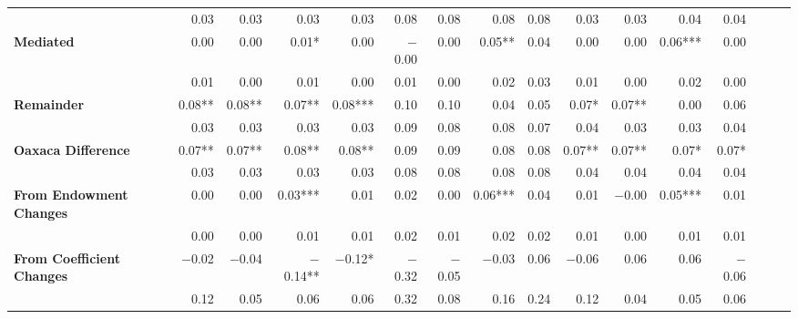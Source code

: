 \begin{tabular}{@{\extracolsep{5pt}}lrrrrrrrrrrrrrrr}
{\bf  } & 0.03\phantom{***} & 0.03\phantom{***} & 0.03\phantom{***} & 0.03\phantom{***} & 0.08\phantom{***} & 0.08\phantom{***} & 0.08\phantom{***} & 0.08\phantom{***} & 0.03\phantom{***} & 0.03\phantom{***} & 0.04\phantom{***} & 0.04\phantom{***} \\
{\bf Mediated} & 0.00\phantom{***} & 0.00\phantom{***} & 0.01*\phantom{**} & 0.00\phantom{***} & $-$0.00\phantom{***} & 0.00\phantom{***} & 0.05**\phantom{*} & 0.04\phantom{***} & 0.00\phantom{***} & 0.00\phantom{***} & 0.06*** & 0.00\phantom{***} \\
{\bf  } & 0.01\phantom{***} & 0.00\phantom{***} & 0.01\phantom{***} & 0.00\phantom{***} & 0.01\phantom{***} & 0.00\phantom{***} & 0.02\phantom{***} & 0.03\phantom{***} & 0.01\phantom{***} & 0.00\phantom{***} & 0.02\phantom{***} & 0.00\phantom{***} \\
{\bf Remainder} & 0.08**\phantom{*} & 0.08**\phantom{*} & 0.07**\phantom{*} & 0.08*** & 0.10\phantom{***} & 0.10\phantom{***} & 0.04\phantom{***} & 0.05\phantom{***} & 0.07*\phantom{**} & 0.07**\phantom{*} & 0.00\phantom{***} & 0.06\phantom{***} \\
{\bf  } & 0.03\phantom{***} & 0.03\phantom{***} & 0.03\phantom{***} & 0.03\phantom{***} & 0.09\phantom{***} & 0.08\phantom{***} & 0.08\phantom{***} & 0.07\phantom{***} & 0.04\phantom{***} & 0.03\phantom{***} & 0.03\phantom{***} & 0.04\phantom{***} \\
{\bf Oaxaca Difference} & 0.07**\phantom{*} & 0.07**\phantom{*} & 0.08**\phantom{*} & 0.08**\phantom{*} & 0.09\phantom{***} & 0.09\phantom{***} & 0.08\phantom{***} & 0.08\phantom{***} & 0.07**\phantom{*} & 0.07**\phantom{*} & 0.07*\phantom{**} & 0.07*\phantom{**} \\
{\bf  } & 0.03\phantom{***} & 0.03\phantom{***} & 0.03\phantom{***} & 0.03\phantom{***} & 0.08\phantom{***} & 0.08\phantom{***} & 0.08\phantom{***} & 0.08\phantom{***} & 0.04\phantom{***} & 0.04\phantom{***} & 0.04\phantom{***} & 0.04\phantom{***} \\
{\bf From Endowment Changes} & 0.00\phantom{***} & 0.00\phantom{***} & 0.03*** & 0.01\phantom{***} & 0.02\phantom{***} & 0.00\phantom{***} & 0.06*** & 0.04\phantom{***} & 0.01\phantom{***} & $-$0.00\phantom{***} & 0.05*** & 0.01\phantom{***} \\
{\bf  } & 0.00\phantom{***} & 0.00\phantom{***} & 0.01\phantom{***} & 0.01\phantom{***} & 0.02\phantom{***} & 0.01\phantom{***} & 0.02\phantom{***} & 0.02\phantom{***} & 0.01\phantom{***} & 0.00\phantom{***} & 0.01\phantom{***} & 0.01\phantom{***} \\
{\bf From Coefficient Changes} & $-$0.02\phantom{***} & $-$0.04\phantom{***} & $-$0.14**\phantom{*} & $-$0.12*\phantom{**} & $-$0.32\phantom{***} & $-$0.05\phantom{***} & $-$0.03\phantom{***} & 0.06\phantom{***} & $-$0.06\phantom{***} & 0.06\phantom{***} & 0.06\phantom{***} & $-$0.06\phantom{***} \\
{\bf  } & 0.12\phantom{***} & 0.05\phantom{***} & 0.06\phantom{***} & 0.06\phantom{***} & 0.32\phantom{***} & 0.08\phantom{***} & 0.16\phantom{***} & 0.24\phantom{***} & 0.12\phantom{***} & 0.04\phantom{***} & 0.05\phantom{***} & 0.06\phantom{***} \\
\hline
\end{tabular}
